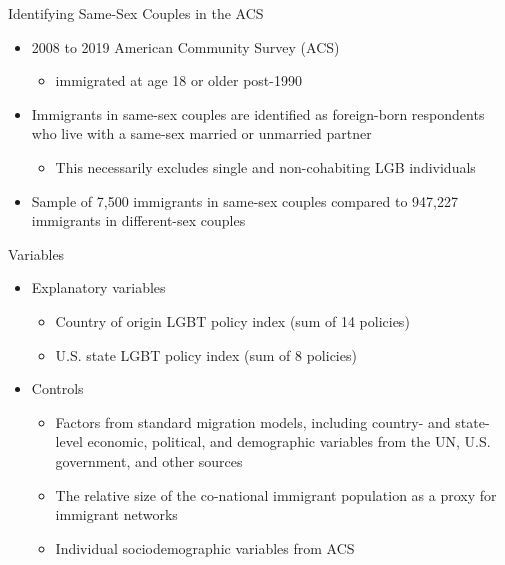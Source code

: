 \documentclass[
  ignorenonframetext,
]{beamer}
\providecommand{\tightlist}{%
  \setlength{\itemsep}{0pt}\setlength{\parskip}{0pt}}
\begin{document}
\begin{frame}{Identifying Same-Sex Couples in the ACS}
\protect\hypertarget{identifying-same-sex-couples-in-the-acs}{}
\begin{itemize}
\tightlist
\item
  2008 to 2019 American Community Survey (ACS)

  \begin{itemize}
  \tightlist
  \item
    immigrated at age 18 or older post-1990
  \end{itemize}
\item
  Immigrants in same-sex couples are identified as foreign-born
  respondents who live with a same-sex married or unmarried partner

  \begin{itemize}
  \tightlist
  \item
    This necessarily excludes single and non-cohabiting LGB individuals
  \end{itemize}
\item
  Sample of 7,500 immigrants in same-sex couples compared to 947,227
  immigrants in different-sex couples
\end{itemize}
\end{frame}

\begin{frame}{Variables}
\protect\hypertarget{variables}{}
\begin{itemize}
\tightlist
\item
  Explanatory variables

  \begin{itemize}
  \tightlist
  \item
    Country of origin LGBT policy index (sum of 14 policies)
  \item
    U.S. state LGBT policy index (sum of 8 policies)
  \end{itemize}
\item
  Controls

  \begin{itemize}
  \tightlist
  \item
    Factors from standard migration models, including country- and
    state-level economic, political, and demographic variables from the
    UN, U.S. government, and other sources
  \item
    The relative size of the co-national immigrant population as a proxy
    for immigrant networks
  \item
    Individual sociodemographic variables from ACS
  \end{itemize}
\end{itemize}
\end{frame}
\end{document}
